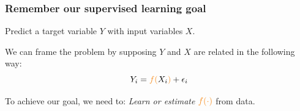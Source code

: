 \documentclass{beamer}
\newcommand{\bo}[1]{\textcolor{burntorange}{#1}}
\newcommand{\skoo}{\vspace{.2in}}
\newcommand{\skooo}{\vspace{.3in}}
\begin{document}
%
%
%
%



\begin{frame}[plain]
\frametitle{Remember our supervised learning goal}
Predict a \bo{target variable $Y$} with \bo{input variables $X$}.\skooo 


\pause
\skooo
\skoo

We can frame the problem by supposing $Y$ and $X$ are related in the following way:
$$
Y_i = \bo{f(}X_i\bo{)} + \epsilon_i
$$

\skoo
{To achieve our goal, we need to: {\it Learn or estimate} $\bo{f(\cdot)}$ from data. }


\end{frame}
\end{document}
